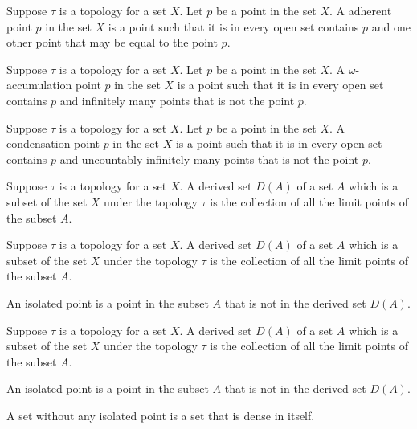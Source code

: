 \begin{definition}
	\label{definition-adherent-point}
	Suppose $\tau$ is a topology for a set $X$.
	Let $p$ be a point in the set $X$.
	A adherent point $p$ in the set $X$ is a point such that it is in every open set contains $p$ and one other point that may be equal to the point $p$.
\end{definition}

\begin{definition}
	\label{definition-omega-accumulation-point}
	Suppose $\tau$ is a topology for a set $X$.
	Let $p$ be a point in the set $X$.
	A $\omega$-accumulation point $p$ in the set $X$ is a point such that it is in every open set contains $p$ and infinitely many points that is not the point $p$.
\end{definition}

\begin{definition}
	\label{definition-condensation-point}
	Suppose $\tau$ is a topology for a set $X$.
	Let $p$ be a point in the set $X$.
	A condensation point $p$ in the set $X$ is a point such that it is in every open set contains $p$ and uncountably infinitely many points that is not the point $p$.
\end{definition}

\begin{definition}
	\label{definition-derived-set}
	Suppose $\tau$ is a topology for a set $X$.
	A derived set $D(A)$ of a set $A$ which is a subset of the set $X$ under the topology $\tau$ is the collection of all the limit points of the subset $A$.
\end{definition}

\begin{definition}
	\label{definition-isolated-point}
	Suppose $\tau$ is a topology for a set $X$.
	A derived set $D(A)$ of a set $A$ which is a subset of the set $X$ under the topology $\tau$ is the collection of all the limit points of the subset $A$.

	An isolated point is a point in the subset $A$ that is not in the derived set $D(A)$.
\end{definition}

\begin{definition}
	\label{definition-dense-in-itself}
	Suppose $\tau$ is a topology for a set $X$.
	A derived set $D(A)$ of a set $A$ which is a subset of the set $X$ under the topology $\tau$ is the collection of all the limit points of the subset $A$.

	An isolated point is a point in the subset $A$ that is not in the derived set $D(A)$.

	A set without any isolated point is a set that is dense in itself.
\end{definition}

